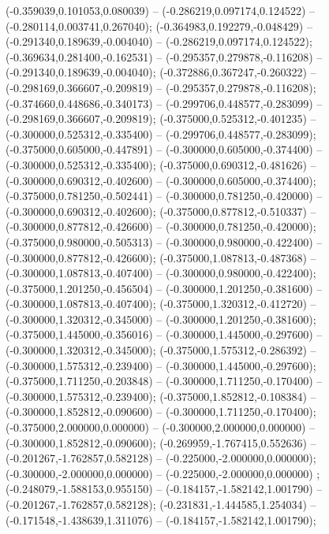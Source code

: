  (-0.359039,0.101053,0.080039) -- (-0.286219,0.097174,0.124522) -- (-0.280114,0.003741,0.267040);
 (-0.364983,0.192279,-0.048429) -- (-0.291340,0.189639,-0.004040) -- (-0.286219,0.097174,0.124522);
 (-0.369634,0.281400,-0.162531) -- (-0.295357,0.279878,-0.116208) -- (-0.291340,0.189639,-0.004040);
 (-0.372886,0.367247,-0.260322) -- (-0.298169,0.366607,-0.209819) -- (-0.295357,0.279878,-0.116208);
 (-0.374660,0.448686,-0.340173) -- (-0.299706,0.448577,-0.283099) -- (-0.298169,0.366607,-0.209819);
 (-0.375000,0.525312,-0.401235) -- (-0.300000,0.525312,-0.335400) -- (-0.299706,0.448577,-0.283099);
 (-0.375000,0.605000,-0.447891) -- (-0.300000,0.605000,-0.374400) -- (-0.300000,0.525312,-0.335400);
 (-0.375000,0.690312,-0.481626) -- (-0.300000,0.690312,-0.402600) -- (-0.300000,0.605000,-0.374400);
 (-0.375000,0.781250,-0.502441) -- (-0.300000,0.781250,-0.420000) -- (-0.300000,0.690312,-0.402600);
 (-0.375000,0.877812,-0.510337) -- (-0.300000,0.877812,-0.426600) -- (-0.300000,0.781250,-0.420000);
 (-0.375000,0.980000,-0.505313) -- (-0.300000,0.980000,-0.422400) -- (-0.300000,0.877812,-0.426600);
 (-0.375000,1.087813,-0.487368) -- (-0.300000,1.087813,-0.407400) -- (-0.300000,0.980000,-0.422400);
 (-0.375000,1.201250,-0.456504) -- (-0.300000,1.201250,-0.381600) -- (-0.300000,1.087813,-0.407400);
 (-0.375000,1.320312,-0.412720) -- (-0.300000,1.320312,-0.345000) -- (-0.300000,1.201250,-0.381600);
 (-0.375000,1.445000,-0.356016) -- (-0.300000,1.445000,-0.297600) -- (-0.300000,1.320312,-0.345000);
 (-0.375000,1.575312,-0.286392) -- (-0.300000,1.575312,-0.239400) -- (-0.300000,1.445000,-0.297600);
 (-0.375000,1.711250,-0.203848) -- (-0.300000,1.711250,-0.170400) -- (-0.300000,1.575312,-0.239400);
 (-0.375000,1.852812,-0.108384) -- (-0.300000,1.852812,-0.090600) -- (-0.300000,1.711250,-0.170400);
 (-0.375000,2.000000,0.000000) -- (-0.300000,2.000000,0.000000) -- (-0.300000,1.852812,-0.090600);
 (-0.269959,-1.767415,0.552636) -- (-0.201267,-1.762857,0.582128) -- (-0.225000,-2.000000,0.000000);
 (-0.300000,-2.000000,0.000000) -- (-0.225000,-2.000000,0.000000) ;
 (-0.248079,-1.588153,0.955150) -- (-0.184157,-1.582142,1.001790) -- (-0.201267,-1.762857,0.582128);
 (-0.231831,-1.444585,1.254034) -- (-0.171548,-1.438639,1.311076) -- (-0.184157,-1.582142,1.001790);

